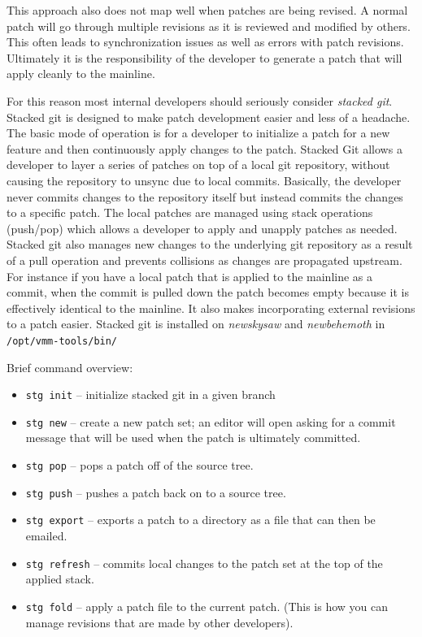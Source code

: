 \documentclass[11pt]{article}
\begin{document}
This approach also does not map well when patches are being revised. A
normal patch will go through multiple revisions as it is reviewed and
modified by others. This often leads to synchronization issues as well
as errors with patch revisions. Ultimately it is the responsibility of
the developer to generate a patch that will apply cleanly to the
mainline.

For this reason most internal developers should seriously consider
{\em stacked git}. Stacked git is designed to make patch development
easier and less of a headache. The basic mode of operation is for a
developer to initialize a patch for a new feature and then
continuously apply changes to the patch. Stacked Git allows a
developer to layer a series of patches on top of a local git
repository, without causing the repository to unsync due to local
commits. Basically, the developer never commits changes to the
repository itself but instead commits the changes to a specific
patch. The local patches are managed using stack operations (push/pop)
which allows a developer to apply and unapply patches as
needed. Stacked git also manages new changes to the underlying git
repository as a result of a pull operation and prevents collisions as
changes are propagated upstream. For instance if you have a local
patch that is applied to the mainline as a commit, when the commit is
pulled down the patch becomes empty because it is effectively
identical to the mainline. It also makes incorporating external
revisions to a patch easier. Stacked git is installed on {\em
newskysaw} and {\em newbehemoth} in \verb./opt/vmm-tools/bin/.

Brief command overview:
\begin{itemize}
\item \verb.stg init. -- initialize stacked git in a given branch
\item \verb.stg new. -- create a new patch set; an editor will open
asking for a commit message that will be used when the patch is
ultimately committed.
\item \verb.stg pop. -- pops a patch off of the source tree.
\item \verb.stg push. -- pushes a patch back on to a source tree.
\item \verb.stg export. -- exports a patch to a directory as a file
that can then be emailed.
\item \verb.stg refresh. -- commits local changes to the patch set at
the top of the applied stack.
\item \verb.stg fold. -- apply a patch file to the current
patch. (This is how you can manage revisions that are made by other developers).
\end{itemize}
\end{document}
